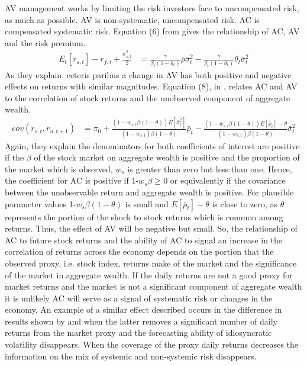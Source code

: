 AV management works by limiting the risk investors face to uncompensated risk, as much as possible. AV is non-systematic, uncompensated risk. AC is compensated systematic risk. Equation (6) from \citet{pollet_average_2010} gives the relationship of AC, AV and the risk premium.
\begin{align*}
	E_{t}[r_{s,t}] - r_{f,t} + \frac{\sigma^{2}_{s,t}}{2} &= \frac{\gamma}{\beta_{t}(1-\theta_{t})}\bar{\rho}\bar{\sigma}^{2}_{t} - \frac{\gamma}{\beta_{t}(1-\theta_{t})}\theta_{t}\bar{\sigma}^{2}_{t}
\end{align*}
As they explain, ceteris paribus a change in AV has both positive and negative effects on returns with similar magnitudes. Equation (8), in \cite{pollet_average_2010}, relates AC and AV to the correlation of stock returns and the unobserved component of aggregate wealth.
\begin{align*}
cov(r_{s,t},r_{u,t+1}) &= \pi_{0} + \frac{(1-w_{s,t}\beta(1-\theta))E[\bar{\sigma}^{2}_{t}]}{(1-w_{s,t})\beta(1-\theta)}\bar{\rho}_{t}- \frac{(1-w_{s,t}\beta(1-\theta))E[\bar{\rho}_{t}]-\theta}{(1-w_{s,t})\beta(1-\theta)}\bar{\sigma}^{2}_{t}
\end{align*}
Again, they explain the denominators for both coefficients of interest are positive if the $\beta$ of the stock market on aggregate wealth is positive and the proportion of the market which is observed, $w_{s}$ is greater than zero but less than one. Hence, the coefficient for AC is positive if 1-$w_{s}\beta \geq 0$ or equivalently if the covariance between the unobservable return and aggregate wealth is positive. For plausible parameter values 1-$w_{s}\beta(1-\theta)$ is small and $E[\bar{\rho}_{t}]-\theta$ is close to zero, as $\theta$ represents the portion of the shock to stock returns which is common among returns. Thus, the effect of AV will be negative but small. So, the relationship of AC to future stock returns and the ability of AC to signal an increase in the correlation of returns across the economy depends on the portion that the observed proxy, i.e. stock index, returns make of the market and the significance of the market in aggregate wealth. If the daily returns are not a good proxy for market returns and the market is not a significant component of aggregate wealth it is unlikely AC will serve as a signal of systematic risk or changes in the economy. An example of a similar effect described occurs in the difference in results shown by \citet{goyal_idiosyncratic_2003} and \citet{bali_does_nodate} when the latter removes a significant number of daily returns from the market proxy and the forecasting ability of idiosyncratic volatility disappears. When the coverage of the proxy daily returns decreases the information on the mix of systemic and non-systemic risk disappears.


